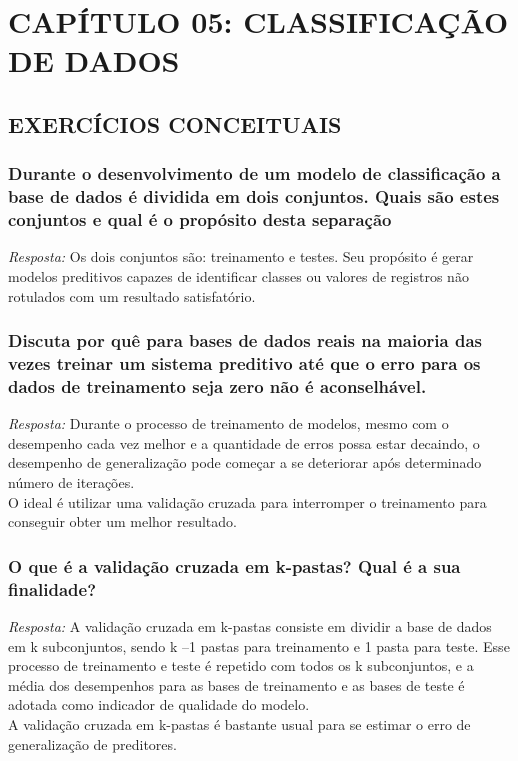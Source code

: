 \documentclass{article}
\begin{document}
\newpage
\setcounter{section}{4}
\section{CAPÍTULO 05: CLASSIFICAÇÃO DE DADOS}
\subsection{EXERCÍCIOS CONCEITUAIS}
\subsubsection{Durante o desenvolvimento de um modelo de classificação a base de dados é dividida em dois conjuntos. Quais são estes conjuntos e qual é o propósito desta separação}
\textit{Resposta:} Os dois conjuntos são: treinamento e testes. Seu propósito é gerar modelos preditivos capazes de identificar classes ou valores de registros não rotulados com um resultado satisfatório. 

\subsubsection{Discuta por quê para bases de dados reais na maioria das vezes treinar um sistema preditivo até que o erro para os dados de treinamento seja zero não é aconselhável.}
\textit{Resposta:} Durante o processo de treinamento de modelos, mesmo com o desempenho cada vez melhor e a quantidade de erros possa estar decaindo, o desempenho de generalização pode começar a se deteriorar após determinado número de iterações. \\
O ideal é utilizar uma validação cruzada para interromper o treinamento para conseguir obter um melhor resultado.

\subsubsection{O que é a validação cruzada em k-pastas? Qual é a sua finalidade?}
\textit{Resposta:} A validação cruzada em k-pastas consiste em dividir a base de dados em k subconjuntos, sendo k –1 pastas para treinamento e 1 pasta para teste. Esse processo de treinamento e teste é repetido com todos os k subconjuntos, e a média dos desempenhos para as bases de treinamento e as bases de teste é adotada como indicador de qualidade do modelo. \\
A validação cruzada em k-pastas é bastante usual para se estimar o erro de generalização de preditores.
\end{document}
